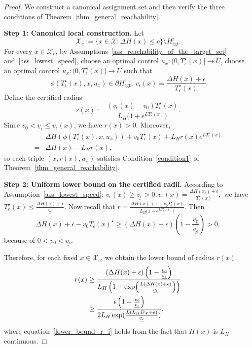 \documentclass[10pt,a4paper]{amsart}
\newcommand{\X}{\mathcal{X}}
\newcommand{\tgt}{\mathrm{tgt}}
\begin{document}
\begin{proof}
We construct a canonical assignment set and then verify the three conditions of Theorem~\ref{thm_general_reachability}.

\medskip
\noindent\textbf{Step 1: Canonical local construction.}
Let 
\[
\X_c:=\{x\in \X:\Delta H(x)\le c\}\setminus H_{\tgt}^\epsilon.
\]
For every $x \in \X_c$, by Assumptions~\ref{ass_reachability_of_the_target_set}
and~\ref{ass_lowest_speed}, choose an optimal control $u_x:(0,T_\epsilon^\star(x)] \to U$, choose an optimal control $u_x:(0, T_\epsilon^\star(x)] \to U$ such that 
\[
\phi(T_\epsilon^\star(x),x,u_x) \in \partial H_{\tgt}^\epsilon, \,
v_\epsilon(x) = \frac{\Delta H(x) + \epsilon}{T_\epsilon^\star(x)}
\]
Define the certified radius
\[
r(x)
:=
\frac{(v_\epsilon(x)-v_0) T_\epsilon^\star(x)}
{L_H\bigl(1+e^{LT_\epsilon^\star(x)}\bigr)}.
\]
Since $v_0<\underline v_\epsilon\le v_\epsilon(x)$, we have $r(x)>0$.
Moreover,
\begin{align*}
 & \Delta H(\phi(T_\epsilon^\star(x),x,u_x))
+v_0T_\epsilon^\star(x)
+L_Hr(x)e^{LT_\epsilon^\star(x)}\\
= &
\Delta H(x)-L_Hr(x),
\end{align*}
so each triple $(x,r(x),u_x)$ satisfies Condition~\ref{condition1} of
Theorem~\ref{thm_general_reachability}.

\noindent\textbf{Step 2: Uniform lower bound on the certified radii.}
According to Assumption~\ref{ass_lowest_speed}: $v_\epsilon(x)\geq \underline{v_\epsilon}>0,
v_\epsilon(x)=\frac{\Delta H(x_i)+\epsilon}{T_\epsilon^\star(x)},$
we have $T_\epsilon^\star(x) \leq \frac{\Delta H(x)+\epsilon}{\underline{v_\epsilon}}$.
Now recall that $r
=
\frac{\Delta H(x)+\epsilon-v_0 T_\epsilon^\star(x)}
{L_H\bigl(1+e^{LT_\epsilon^\star(x)}\bigr)}$. Then
\[
\Delta H(x)+\epsilon-v_0 T_\epsilon(x)^\star
\geq
(\Delta H(x)+\epsilon)\left(1-\frac{v_0}{\underline{v_\epsilon}}\right)> 0,
\]
because of 
$0<v_0<\underline{v_\epsilon}$.

Therefore, for each fixed $x \in \X_c$, we obtain the lower bound of radius $r(x)$
\begin{align}
r(x) & 
\geq
\frac{
(\Delta H(x)+\epsilon)\left(1-\frac{v_0}{\underline{v_\epsilon}}\right)
}{
L_H\left(
1+\exp\!\left(\frac{L(\Delta H(x)+\epsilon)}{\underline{v_\epsilon}}\right)
\right)
} \notag \\
& \ge \frac{
\epsilon \left(1-\frac{v_0}{\underline{v_\epsilon}}\right)
}{2 L_H \exp(\frac{L(L_H D_{\mathcal{X}} +\epsilon)}{\underline{v_\epsilon}})
}, \label{lower_bound_r_i}
\end{align}
where equation~\eqref{lower_bound_r_i} holds from the fact that $H(x)$ is $L_H$-continuous.


\end{proof}
\end{document}
